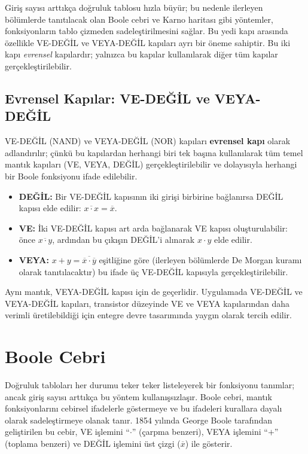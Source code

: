 Giriş sayısı arttıkça doğruluk tablosu hızla büyür; bu nedenle ilerleyen bölümlerde tanıtılacak olan Boole cebri ve Karno haritası gibi yöntemler, fonksiyonların tablo çizmeden sadeleştirilmesini sağlar. Bu yedi kapı arasında özellikle VE-DEĞİL ve VEYA-DEĞİL kapıları ayrı bir öneme sahiptir. Bu iki kapı \emph{evrensel} kapılardır; yalnızca bu kapılar kullanılarak diğer tüm kapılar gerçekleştirilebilir.

\subsection{Evrensel Kapılar: VE-DEĞİL ve VEYA-DEĞİL}

VE-DEĞİL (NAND) ve VEYA-DEĞİL (NOR) kapıları \textbf{evrensel kapı} olarak adlandırılır; çünkü bu kapılardan herhangi biri tek başına kullanılarak tüm temel mantık kapıları (VE, VEYA, DEĞİL) gerçekleştirilebilir ve dolayısıyla herhangi bir Boole fonksiyonu ifade edilebilir.

\begin{itemize}[nosep]
    \item \textbf{DEĞİL:} Bir VE-DEĞİL kapısının iki girişi birbirine bağlanırsa DEĞİL kapısı elde edilir: $\overline{x \cdot x} = \overline{x}$.
    \item \textbf{VE:} İki VE-DEĞİL kapısı art arda bağlanarak VE kapısı oluşturulabilir: önce $\overline{x \cdot y}$, ardından bu çıkışın DEĞİL'i alınarak $x \cdot y$ elde edilir.
    \item \textbf{VEYA:} $x + y = \overline{\overline{x} \cdot \overline{y}}$ eşitliğine göre (ilerleyen bölümlerde De Morgan kuramı olarak tanıtılacaktır) bu ifade üç VE-DEĞİL kapısıyla gerçekleştirilebilir.
\end{itemize}

Aynı mantık, VEYA-DEĞİL kapısı için de geçerlidir. Uygulamada VE-DEĞİL ve VEYA-DEĞİL kapıları, transistor düzeyinde VE ve VEYA kapılarından daha verimli üretilebildiği için entegre devre tasarımında yaygın olarak tercih edilir.


\section{Boole Cebri}

Doğruluk tabloları her durumu teker teker listeleyerek bir fonksiyonu tanımlar; ancak giriş sayısı arttıkça bu yöntem kullanışsızlaşır. Boole cebri, mantık fonksiyonlarını cebirsel ifadelerle göstermeye ve bu ifadeleri kurallara dayalı olarak sadeleştirmeye olanak tanır. 1854 yılında George Boole tarafından geliştirilen bu cebir, VE işlemini ``$\cdot$'' (çarpma benzeri), VEYA işlemini ``$+$'' (toplama benzeri) ve DEĞİL işlemini üst çizgi ($\overline{x}$) ile gösterir.

